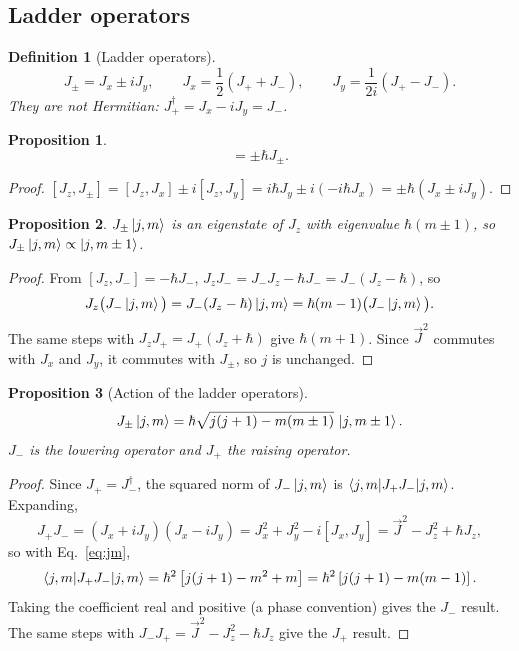 \documentclass{article}
\newtheorem{definition}{Definition}
\newtheorem{proposition}{Proposition}
\begin{document}
\subsection{Ladder operators}
\label{sec:ladder}
\begin{definition}[Ladder operators]
    \begin{equation}
        J_\pm = J_x \pm iJ_y, \qquad J_x = \frac{1}{2}\left(J_+ + J_-\right), \qquad J_y = \frac{1}{2i}\left(J_+ - J_-\right).
    \end{equation}
    They are not Hermitian: $J_+^\dagger = J_x - iJ_y = J_-$.
\end{definition}
\begin{proposition}
    \begin{equation}
        [J_z,J_\pm] = \pm\hbar J_\pm.
    \end{equation}
\end{proposition}
\begin{proof}
    $[J_z,J_\pm] = [J_z,J_x] \pm i[J_z,J_y] = i\hbar J_y \pm i(-i\hbar J_x) = \pm\hbar\left(J_x \pm iJ_y\right)$.
\end{proof}
\begin{proposition}
    $J_\pm\ket{j,m}$ is an eigenstate of $J_z$ with eigenvalue $\hbar(m\pm1)$, so $J_\pm\ket{j,m} \propto \ket{j,m\pm1}$.
\end{proposition}
\begin{proof}
    From $[J_z,J_-] = -\hbar J_-$, $J_zJ_- = J_-J_z - \hbar J_- = J_-(J_z - \hbar)$, so
    \[J_z\big(J_-\ket{j,m}\big) = J_-(J_z - \hbar)\ket{j,m} = \hbar(m-1)\big(J_-\ket{j,m}\big).\]
    The same steps with $J_zJ_+ = J_+(J_z + \hbar)$ give $\hbar(m+1)$. Since $\vec{J}^2$ commutes with $J_x$ and $J_y$, it commutes with $J_\pm$, so $j$ is unchanged.
\end{proof}
\begin{proposition}[Action of the ladder operators]
    \begin{equation}
        J_\pm\ket{j,m} = \hbar\sqrt{j(j+1) - m(m\pm1)}\,\ket{j,m\pm1}.
    \end{equation}
    $J_-$ is the \emph{lowering operator} and $J_+$ the \emph{raising operator}.
\end{proposition}
\begin{proof}
    Since $J_+ = J_-^\dagger$, the squared norm of $J_-\ket{j,m}$ is $\braket{j,m|J_+J_-|j,m}$. Expanding,
    \[J_+J_- = (J_x + iJ_y)(J_x - iJ_y) = J_x^2 + J_y^2 - i[J_x,J_y] = \vec{J}^2 - J_z^2 + \hbar J_z,\]
    so with Eq.~\eqref{eq:jm},
    \[\braket{j,m|J_+J_-|j,m} = \hbar^2\left[j(j+1) - m^2 + m\right] = \hbar^2\left[j(j+1) - m(m-1)\right].\]
    Taking the coefficient real and positive (a phase convention) gives the $J_-$ result. The same steps with $J_-J_+ = \vec{J}^2 - J_z^2 - \hbar J_z$ give the $J_+$ result.
\end{proof}
\end{document}
